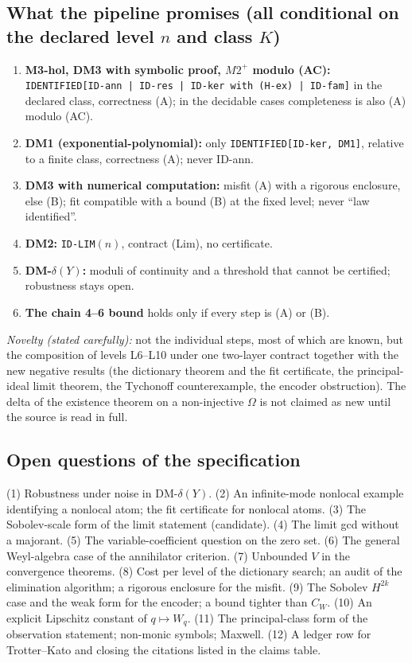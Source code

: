 \documentclass[11pt]{article}
\theoremstyle{plain}
\theoremstyle{definition}
\theoremstyle{remark}
\begin{document}
\subsection*{What the pipeline promises (all conditional on the declared level $n$ and class $K$)}
\begin{enumerate}
\item \textbf{M3-hol, DM3 with symbolic proof, $M2^+$ modulo (AC):} \texttt{IDENTIFIED[ID-ann | ID-res | ID-ker with (H-ex) | ID-fam]} in the declared class, correctness (A); in the decidable cases completeness is also (A) modulo (AC).
\item \textbf{DM1 (exponential-polynomial):} only \texttt{IDENTIFIED[ID-ker, DM1]}, relative to a finite class, correctness (A); never ID-ann.
\item \textbf{DM3 with numerical computation:} misfit (A) with a rigorous enclosure, else (B); fit compatible with a bound (B) at the fixed level; never ``law identified''.
\item \textbf{DM2:} \texttt{ID-LIM}$(n)$, contract (Lim), no certificate.
\item \textbf{DM-$\delta(Y)$:} moduli of continuity and a threshold that cannot be certified; robustness stays open.
\item \textbf{The chain 4--6 bound} holds only if every step is (A) or (B).
\end{enumerate}
\emph{Novelty (stated carefully):} not the individual steps, most of which are known, but the composition of levels L6--L10 under one two-layer contract together with the new negative results (the dictionary theorem and the fit certificate, the principal-ideal limit theorem, the Tychonoff counterexample, the encoder obstruction). The delta of the existence theorem on a non-injective $\Omega$ is not claimed as new until the source is read in full.

\subsection*{Open questions of the specification}
(1) Robustness under noise in DM-$\delta(Y)$. (2) An infinite-mode nonlocal example identifying a nonlocal atom; the fit certificate for nonlocal atoms. (3) The Sobolev-scale form of the limit statement (candidate). (4) The limit gcd without a majorant. (5) The variable-coefficient question on the zero set. (6) The general Weyl-algebra case of the annihilator criterion. (7) Unbounded $V$ in the convergence theorems. (8) Cost per level of the dictionary search; an audit of the elimination algorithm; a rigorous enclosure for the misfit. (9) The Sobolev $H^{2k}$ case and the weak form for the encoder; a bound tighter than $C_W$. (10) An explicit Lipschitz constant of $q\mapsto W_q$. (11) The principal-class form of the observation statement; non-monic symbols; Maxwell. (12) A ledger row for Trotter--Kato and closing the citations listed in the claims table.

\end{document}

